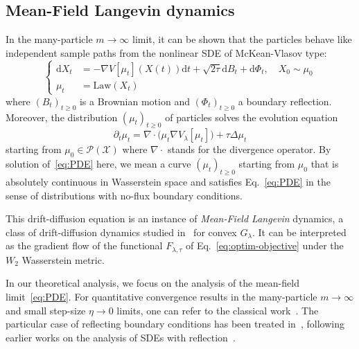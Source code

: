 \documentclass[11pt]{article}
\newcommand{\Pp}{\mathcal{P}}
\newcommand{\Xx}{\mathcal{X}}
\renewcommand{\d}{\mathrm{d}}
\begin{document}
\subsection{Mean-Field Langevin dynamics} In the many-particle $m\to \infty$ limit, it can be shown that the particles behave like independent sample paths from the nonlinear SDE of McKean-Vlasov type:
\begin{equation}
\left\{
\begin{aligned}
\d X_t &=-\nabla V[\mu_t] (X(t))\d t + \sqrt{2\tau}\d B_t +\d\Phi_t, \quad X_0\sim \mu_0\\
\mu_t &=\mathrm{Law}(X_t)
\end{aligned}
\right.
\end{equation}
where $(B_t)_{t\geq 0}$ is a Brownian motion and $(\Phi_t)_{t\geq 0}$ a boundary reflection.
Moreover, the distribution $(\mu_t)_{t\geq 0}$ of particles solves the evolution equation
\begin{equation}\label{eq:PDE}
\partial_t \mu_t = \nabla \cdot \big(\mu_t \nabla V_\lambda[\mu_t] \big) +  \tau \Delta \mu_t
\end{equation}
starting from $\mu_0\in \Pp(\Xx)$ where $\nabla \cdot$ stands for the divergence operator. By solution of~\eqref{eq:PDE} here, we mean a curve $(\mu_t)_{t\geq 0}$ starting from $\mu_0$ that is absolutely continuous in Wasserstein space and satisfies Eq.~\eqref{eq:PDE} in the sense of distributions  with no-flux boundary conditions. 

This drift-diffusion equation is an instance of \emph{Mean-Field Langevin} dynamics, a class of drift-diffusion dynamics  studied in~\cite{mei2018mean, hu2019mean, nitanda2022convex,chizat2022mean} for convex $G_\lambda$. It can be interpreted as the gradient flow of the functional $F_{\lambda,\tau}$ of Eq.~\eqref{eq:optim-objective} under the $W_2$ Wasserstein metric. 

In our theoretical analysis, we focus on the analysis of the mean-field limit~\eqref{eq:PDE}. For quantitative convergence results in the many-particle $m\to \infty$ and small step-size $\eta\to 0$ limits, one can refer to the classical work~\cite{sznitman1991topics}. The particular case of reflecting boundary conditions has been treated in~\cite{javanmard2020analysis}, following earlier works on the analysis of SDEs with reflection~\cite{tanaka1979stochastic, lions1984stochastic}.
 
\end{document}

